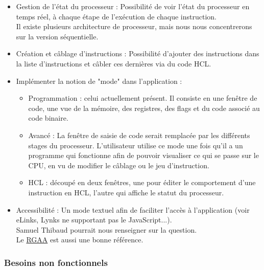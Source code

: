 \documentclass[french]{article}
\begin{document}
\begin{itemize}
    \item Gestion de l'état du processeur : 
    Possibilité de voir l'état du processeur en temps réel, à chaque étape de l'exécution de chaque instruction.\\
    Il existe plusieurs architecture de processeur, mais nous nous concentrerons sur la version séquentielle.
    
    \item Création et câblage d'instructions : 
    Possibilité d'ajouter des instructions dans la liste d'instructions et câbler ces dernières via du code HCL.
    
    \item Implémenter la notion de "mode" dans l'application :
    \begin{itemize}
        \item Programmation : celui actuellement présent. Il consiste en une fenêtre de code, une vue de la mémoire, des registres, des flags et du code associé au code binaire.
        \item Avancé : La fenêtre de saisie de code serait remplacée par les différents stages du processeur. L'utilisateur utilise ce mode une fois qu'il a un programme qui fonctionne afin de pouvoir visualiser ce qui se passe sur le CPU, en vu de modifier le câblage ou le jeu d'instruction.
        \item HCL : découpé en deux fenêtres, une pour éditer le comportement d'une instruction en HCL, l'autre qui affiche le statut du processeur.
    \end{itemize}

    \item Accessibilité :
    Un mode textuel afin de faciliter l'accès à l'application (voir eLinks, Lynks ne supportant pas le JavaScript...).\\
    Samuel Thibaud pourrait nous renseigner sur la question.\\
    Le \href{https://references.modernisation.gouv.fr/rgaa-accessibilite/}{RGAA} est aussi une bonne référence.
\end{itemize}

\subsubsection{Besoins non fonctionnels}
\end{document}
